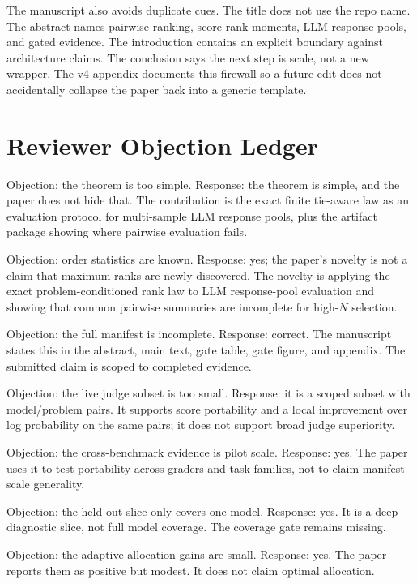The manuscript also avoids duplicate cues. The title does not use the repo
name. The abstract names pairwise ranking, score-rank moments, LLM response
pools, and gated evidence. The introduction contains an explicit boundary
against architecture claims. The conclusion says the next step is scale, not a
new wrapper. The v4 appendix documents this firewall so a future edit does not
accidentally collapse the paper back into a generic template.

\section{Reviewer Objection Ledger}
\label{app:objection-ledger}

Objection: the theorem is too simple. Response: the theorem is simple, and the
paper does not hide that. The contribution is the exact finite tie-aware law
as an evaluation protocol for multi-sample LLM response pools, plus the
artifact package showing where pairwise evaluation fails.

Objection: order statistics are known. Response: yes; the paper's novelty is
not a claim that maximum ranks are newly discovered. The novelty is applying
the exact problem-conditioned rank law to LLM response-pool evaluation and
showing that common pairwise summaries are incomplete for high-$N$ selection.

Objection: the full manifest is incomplete. Response: correct. The manuscript
states this in the abstract, main text, gate table, gate figure, and appendix.
The submitted claim is scoped to completed evidence.

Objection: the live judge subset is too small. Response: it is a scoped subset
with \EvidenceLiveJudgePairs{} model/problem pairs. It supports score portability
and a local improvement over log probability on the same pairs; it does not
support broad judge superiority.

Objection: the cross-benchmark evidence is pilot scale. Response: yes. The
paper uses it to test portability across graders and task families, not to
claim manifest-scale generality.

Objection: the held-out slice only covers one model. Response: yes. It is a
deep diagnostic slice, not full model coverage. The coverage gate remains
missing.

Objection: the adaptive allocation gains are small. Response: yes. The paper
reports them as positive but modest. It does not claim optimal allocation.

